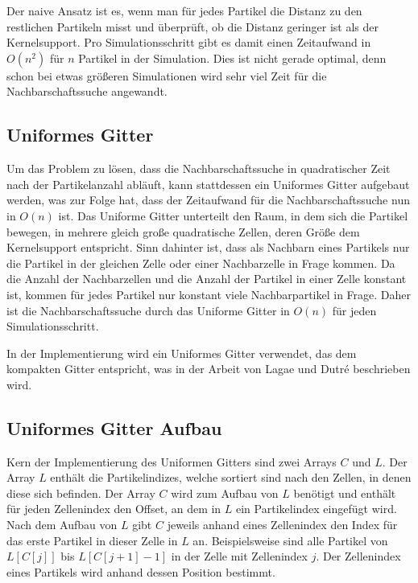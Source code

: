 \documentclass[11pt,
a4paper,
parskip=half, %
BCOR=10mm, %
english,
ngerman]{scrreprt}
\begin{document}
Der naive Ansatz ist es, wenn man für jedes Partikel die Distanz zu den restlichen Partikeln misst und überprüft, ob die Distanz geringer ist als der Kernelsupport.
Pro Simulationsschritt gibt es damit einen Zeitaufwand in $O(n^2)$ für $n$ Partikel in der Simulation.
Dies ist nicht gerade optimal, denn schon bei etwas größeren Simulationen wird sehr viel Zeit für die Nachbarschaftssuche angewandt.


\subsection{Uniformes Gitter}
Um das Problem zu lösen, dass die Nachbarschaftssuche in quadratischer Zeit nach der Partikelanzahl abläuft,
kann stattdessen ein Uniformes Gitter aufgebaut werden, was zur Folge hat, dass der Zeitaufwand für die Nachbarschaftssuche nun in $O(n)$ ist.
Das Uniforme Gitter unterteilt den Raum, in dem sich die Partikel bewegen, in mehrere gleich große quadratische Zellen,
deren Größe dem Kernelsupport entspricht.
Sinn dahinter ist, dass als Nachbarn eines Partikels nur die Partikel in der gleichen Zelle oder einer Nachbarzelle in Frage kommen.
Da die Anzahl der Nachbarzellen und die Anzahl der Partikel in einer Zelle konstant ist,
kommen für jedes Partikel nur konstant viele Nachbarpartikel in Frage.
Daher ist die Nachbarschaftssuche durch das Uniforme Gitter in $O(n)$ für jeden Simulationsschritt.

In der Implementierung wird ein Uniformes Gitter verwendet, das dem kompakten Gitter entspricht,
was in der Arbeit von Lagae und Dutré \cite{lagae_compact_2008} beschrieben wird.

\subsection{Uniformes Gitter Aufbau}
Kern der Implementierung des Uniformen Gitters sind zwei Arrays $C$ und $L$.
Der Array $L$ enthält die Partikelindizes, welche sortiert sind nach den Zellen, in denen diese sich befinden.
Der Array $C$ wird zum Aufbau von $L$ benötigt und enthält für jeden Zellenindex den Offset, an dem in $L$ ein Partikelindex eingefügt wird.
Nach dem Aufbau von $L$ gibt $C$ jeweils anhand eines Zellenindex den Index für das erste Partikel in dieser Zelle in $L$ an.
Beispielsweise sind alle Partikel von $L[C[j]]$ bis $L[C[j+1] - 1]$ in der Zelle mit Zellenindex $j$.
Der Zellenindex eines Partikels wird anhand dessen Position bestimmt.


%
\end{document}

